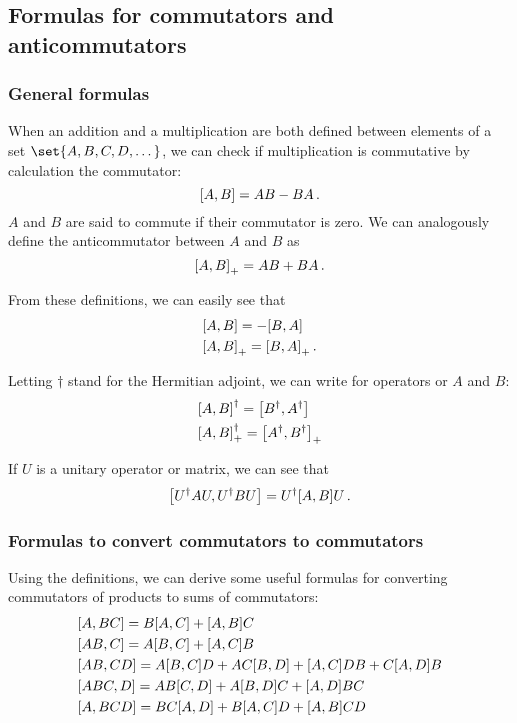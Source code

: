 \subsection{Formulas for commutators and anticommutators}
    \subsubsection{General formulas}
        When an addition and a multiplication are both defined between elements of a set $\set{A, B, C, D, \dots}$, we can check if multiplication is commutative by calculation the commutator:
        \begin{equation}
            \comm{A}{B} = AB - BA \thinspace .
        \end{equation}
        $A$ and $B$ are said to commute if their commutator is zero. We can analogously define the anticommutator between $A$ and $B$ as
        \begin{equation}
            \comm{A}{B}_+ = AB + BA \thinspace .
        \end{equation}

        From these definitions, we can easily see that
        \begin{align}
            & \comm{A}{B} = - \comm{B}{A} \\
            & \comm{A}{B}_+ = \comm{B}{A}_+ \thinspace .
        \end{align}

        Letting $\dagger$ stand for the Hermitian adjoint, we can write for operators or $A$ and $B$:
        \begin{align}
            & \comm{A}{B}^\dagger = \comm{B^\dagger}{A^\dagger} \\
            & \comm{A}{B}^\dagger_+ = \comm{A^\dagger}{B^\dagger}_+
        \end{align}

        If $U$ is a unitary operator or matrix, we can see that
        \begin{equation}
            \comm{U^\dagger A U}{U^\dagger B U } = U^\dagger \comm{A}{B} U \thinspace .
        \end{equation}

    \subsubsection{Formulas to convert commutators to commutators}
        Using the definitions, we can derive some useful formulas for converting commutators of products to sums of commutators:
        \begin{align}
            & \comm{A}{BC} = B \comm{A}{C} + \comm{A}{B} C \\
            & \comm{AB}{C} = A \comm{B}{C} + \comm{A}{C}B \\
            & \comm{AB}{CD} = A \comm{B}{C} D + AC \comm{B}{D} + \comm{A}{C} DB + C \comm{A}{D} B \\
            & \comm{ABC}{D} = AB \comm{C}{D} + A \comm{B}{D} C + \comm{A}{D} BC \\
            & \comm{A}{BCD} = BC \comm{A}{D} + B \comm{A}{C} D + \comm{A}{B} CD
        \end{align}


